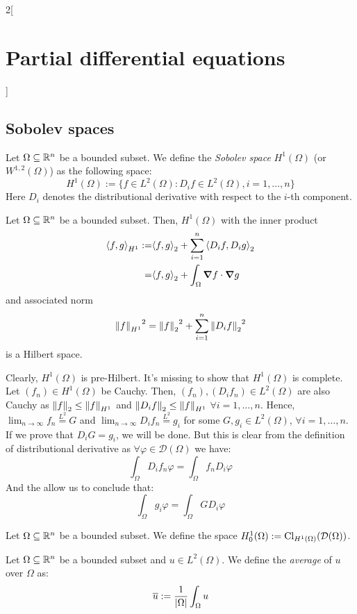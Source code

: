 \documentclass[../../../main_math.tex]{subfiles}
\begin{document}
\begin{multicols}{2}[\section{Partial differential equations}]
  \subsection{Sobolev spaces}
  \begin{definition}
    Let $\Omega\subseteq \mathbb{R}^n$ be a bounded subset. We define the \emph{Sobolev space} $H^1(\Omega)$ (or $W^{1,2}(\Omega)$) as the following space: $$H^1(\Omega):=\{f\in L^2(\Omega):D_if\in L^2(\Omega), i=1,\ldots,n\}$$
    Here $D_i$ denotes the distributional derivative with respect to the $i$-th component.
  \end{definition}
  \begin{proposition}
    Let $\Omega\subseteq \mathbb{R}^n$ be a bounded subset. Then, $H^1(\Omega)$ with the inner product
    \begin{align*}
      {\left\langle f,g\right\rangle}_{H^1} := & {\left\langle f,g\right\rangle}_{2}+\sum_{i=1}^n{\left\langle D_if,D_ig\right\rangle}_{2}  \\
      =                    & {\left\langle f,g\right\rangle}_{2}+\int_\Omega \grad{f}\cdot \grad{g}
    \end{align*}
    and associated norm
    $${\left\|f\right\|_{H^1}}^2={\left\|f\right\|_2}^2 +\sum_{i=1}^n{\left\|D_if\right\|_2}^2$$
    is a Hilbert space.
  \end{proposition}
  \begin{sproof}
    Clearly, $H^1(\Omega)$ is pre-Hilbert. It's missing to show that $H^1(\Omega)$ is complete. Let $(f_n)\in H^1(\Omega)$ be Cauchy. Then, $(f_n), (D_if_n)\in L^2(\Omega)$ are also Cauchy as $\left\|f\right\|_2\leq \left\|f\right\|_{H^1}$ and $\left\|D_if\right\|_2\leq \left\|f\right\|_{H^1}$ $\forall i=1,\ldots,n$. Hence, $\displaystyle\lim_{n\to\infty}f_n\overset{L^2}{=}G$ and $\displaystyle\lim_{n\to\infty}D_if_n\overset{L^2}{=}g_i$ for some $G,g_i\in L^2(\Omega)$, $\forall i=1,\ldots,n$. If we prove that $D_iG=g_i$, we will be done. But this is clear from the definition of distributional derivative as $\forall\varphi\in\mathcal{D}(\Omega)$ we have:
    $$\int_\Omega D_if_n\varphi =\int_\Omega f_n D_i\varphi$$
    And the  allow us to conclude that:
    $$\int_\Omega g_i\varphi =\int_\Omega G D_i\varphi$$
  \end{sproof}
  \begin{definition}
    Let $\Omega\subseteq \mathbb{R}^n$ be a bounded subset. We define the space $H_0^1(\Omega):=\operatorname{Cl}_{H^1(\Omega)}(\mathcal{D}(\Omega))$.
  \end{definition}
  \begin{definition}
    Let $\Omega\subseteq \mathbb{R}^n$ be a bounded subset and $u\in L^2(\Omega)$. We define the \emph{average} of $u$ over $\Omega$ as: $$\overline{u}:=\frac{1}{\m{\Omega}}\int_\Omega u$$

\end{definition}
\end{multicols}
\end{document}
